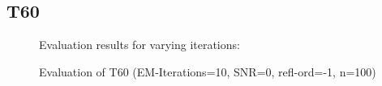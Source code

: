 \subsection{T60}
\begin{figure}[H]
    \setlength\figureheight{7cm}
    \small
    \setlength\figurewidth{\textwidth}
	\centering
	\begin{tikzpicture}
	    \footnotesize
	    
	    
	    
	\end{tikzpicture}
	
	\caption[Evaluation results for varying  iterations]{Evaluation results for varying  iterations: }
	\label{fig:trial1}
\end{figure}
\begin{figure}[H]
    \centering
    \begin{subfigure}{0.49\textwidth}
          \centering
	       
	\end{subfigure}
    \begin{subfigure}{0.49\textwidth}
          \centering
	       
%            
	\end{subfigure}
\caption{Evaluation of T60 (EM-Iterations=10, SNR=0, refl-ord=-1, n=100)}
\end{figure}